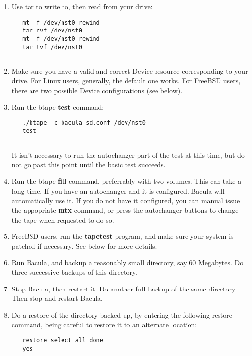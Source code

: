\begin{enumerate}
\item Use tar to write to, then read from your drive:  

   \footnotesize
\begin{verbatim}
   mt -f /dev/nst0 rewind
   tar cvf /dev/nst0 .
   mt -f /dev/nst0 rewind
   tar tvf /dev/nst0
   
\end{verbatim}
\normalsize

\item Make sure you have a valid and correct Device resource  corresponding to
   your drive. For Linux users, generally,  the default one works. For FreeBSD
   users, there are two  possible Device configurations (see below). 
\item Run the btape {\bf test} command:  

   \footnotesize
\begin{verbatim}
   ./btape -c bacula-sd.conf /dev/nst0
   test
   
\end{verbatim}
\normalsize

It isn't necessary to run the autochanger part of the  test at this time,  but
do not go past this point until the basic test succeeds. 
\item Run the btape {\bf fill} command, preferrably with two volumes.  This
   can take a long time. If you have an autochanger and it  is configured, Bacula
   will automatically use it. If you do  not have it configured, you can manual
issue the appopriate  {\bf mtx} command, or press the autochanger buttons to
change  the tape when requested to do so. 
\item FreeBSD users, run the {\bf tapetest} program, and make  sure your
   system is patched if necessary. See below for more  details. 
\item Run Bacula, and backup a reasonably small directory,  say 60 Megabytes.
   Do three successive backups of this  directory. 
\item Stop Bacula, then restart it. Do another full backup  of the same
   directory. Then stop and restart Bacula. 
\item Do a restore of the directory backed up, by entering the  following
   restore command, being careful to restore it to  an alternate location:  

\footnotesize
\begin{verbatim}
   restore select all done
   yes
   

\end{verbatim}
\end{enumerate}

